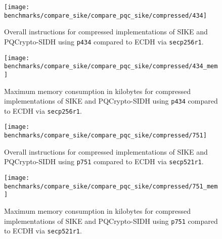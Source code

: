 \begin{figure}[H]
  \centering
  \texttt{[image: benchmarks/compare\_sike/compare\_pqc\_sike/compressed/434]}
  \caption[Instructions of compressed \gls{SIKE} and \gls{PQCrypto-SIDH} implementations (\texttt{p434})]
  {Overall instructions for compressed implementations of \gls{SIKE} and \gls{PQCrypto-SIDH} using \texttt{p434} compared to \gls{ECDH} via \texttt{secp256r1}.}
  \label{fig:results_sike_pqc_comp_434}
\end{figure}

\begin{figure}[H]
  \centering
  \texttt{[image: benchmarks/compare\_sike/compare\_pqc\_sike/compressed/434\_mem]}
  \caption[Memory consumption of compressed \gls{SIKE} and \gls{PQCrypto-SIDH} implementations (\texttt{p434})]
  {Maximum memory consumption in kilobytes for compressed implementations of \gls{SIKE} and \gls{PQCrypto-SIDH} using \texttt{p434} compared to \gls{ECDH} via \texttt{secp256r1}.}
  \label{fig:results_sike_pqc_comp_434_mem}
\end{figure}

\begin{figure}[H]
  \centering
  \texttt{[image: benchmarks/compare\_sike/compare\_pqc\_sike/compressed/751]}
  \caption[Instructions of compressed \gls{SIKE} and \gls{PQCrypto-SIDH} implementations (\texttt{p751})]
  {Overall instructions for compressed implementations of \gls{SIKE} and \gls{PQCrypto-SIDH} using \texttt{p751} compared to \gls{ECDH} via \texttt{secp521r1}.}
  \label{fig:results_sike_pqc_comp_751}
\end{figure}

\begin{figure}[H]
  \centering
  \texttt{[image: benchmarks/compare\_sike/compare\_pqc\_sike/compressed/751\_mem]}
  \caption[Memory consumption of compressed \gls{SIKE} and \gls{PQCrypto-SIDH} implementations (\texttt{p751})]
  {Maximum memory consumption in kilobytes for compressed implementations of \gls{SIKE} and \gls{PQCrypto-SIDH} using \texttt{p751} compared to \gls{ECDH} via \texttt{secp521r1}.}
  \label{fig:results_sike_pqc_comp_751_mem}
\end{figure}

